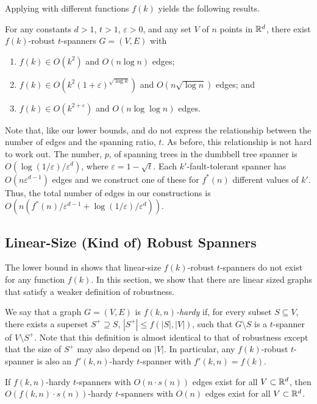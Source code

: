 \documentclass[final]{siamltex}
\newcommand{\eps}{\varepsilon}
\begin{document}
Applying  with different functions $f(k)$ yields the
following results.
\begin{cor}
  For any constants $d >1$, $t>1$, $\eps>0$, and any set $V$ of $n$ points
  in $\mathbb{R}^d$, there exist $f(k)$-robust $t$-spanners $G=(V,E)$ with
  \begin{enumerate}
    \item $f(k)\in O(k^2)$ and $O(n\log n)$ edges;
    \item $f(k)\in O(k^2(1+\eps)^{\sqrt{\log k}})$ and $O(n\sqrt{\log n})$
      edges; and
    \item $f(k)\in O(k^{2+\eps})$ and $O(n\log\log n)$ edges.
  \end{enumerate}
\end{cor}

\begin{rem}
  Note that, like our lower bounds,  and  do
  not express the relationship between the number of edges and the
  spanning ratio, $t$.  As before, this relationship is not hard
  to work out. The number, $p$, of spanning trees in the dumbbell
  tree spanner is $O(\log(1/\eps)/\eps^d)$, where $\eps=1-\sqrt{t}$.
  Each $k'$-fault-tolerant spanner has $O(n\eps^{d-1})$ edges \cite{l99}
  and we construct one of these for $f^*(n)$ different values of $k'$.
  Thus, the total number of edges in our constructions is
  $O(n(f^*(n)/\eps^{d-1} + \log(1/\eps)/\eps^d))$.
\end{rem}


\subsection{Linear-Size (Kind of) Robust Spanners}

The lower bound in  shows that linear-size
$f(k)$-robust $t$-spanners do not exist for any function $f(k)$.  In this
section, we show that there are linear sized graphs that satisfy a weaker
definition of robustness.

We say that a graph $G=(V,E)$ is \emph{$f(k,n)$-hardy} if, for every
subset $S\subseteq V$, there exists a superset $S^+\supseteq S$,
$|S^+|\le f(|S|,|V|)$, such that $G\setminus S$ is a $t$-spanner of
$V\setminus S^+$.  Note that this definition is almost identical to that
of robustness except that the size of $S^+$ may also depend on $|V|$.  In particular, any $f(k)$-robust $t$-spanner is also an $f'(k,n)$-hardy $t$-spanner with $f'(k,n)=f(k)$.

\begin{thm}
  If $f(k,n)$-hardy $t$-spanners with $O(n\cdot s(n))$ edges exist for
  all $V\subset\mathbb{R}^d$, then $O(f(k,n)\cdot s(n))$-hardy $t$-spanners with
  $O(n)$ edges exist for all $V\subset\mathbb{R}^d$.
\end{thm}
\end{document}
